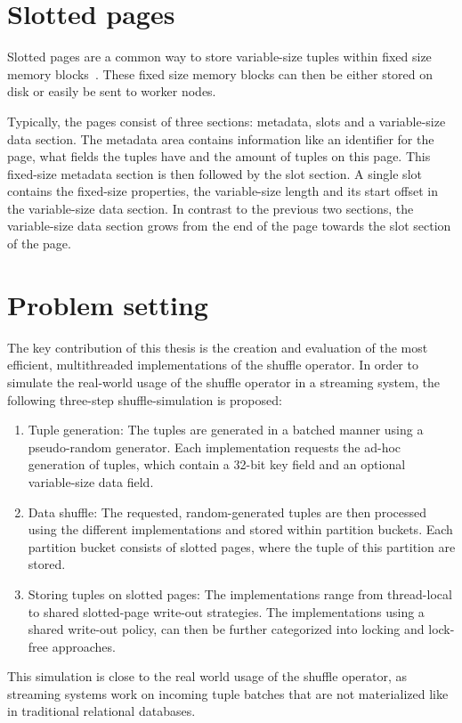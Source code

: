 \section{Slotted pages}
Slotted pages are a common way to store variable-size tuples within fixed size memory blocks~\parencite{Data-page-layouts-for-relational-databases}. These fixed size memory blocks can then be either stored on disk or easily be sent to worker nodes.

Typically, the pages consist of three sections: metadata, slots and a variable-size data section. The metadata area contains information like an identifier for the page, what fields the tuples have and the amount of tuples on this page. This fixed-size metadata section is then followed by the slot section. A single slot contains the fixed-size properties, the variable-size length and its start offset in the variable-size data section. In contrast to the previous two sections, the variable-size data section grows from the end of the page towards the slot section of the page.


\section{Problem setting}
The key contribution of this thesis is the creation and evaluation of the most efficient, multithreaded implementations of the shuffle operator.
In order to simulate the real-world usage of the shuffle operator in a streaming system, the following three-step shuffle-simulation is proposed:

\begin{enumerate}
    \item Tuple generation: The tuples are generated in a batched manner using a pseudo-random generator. Each implementation requests the ad-hoc generation of tuples, which contain a 32-bit key field and an optional variable-size data field.

    \item Data shuffle: The requested, random-generated tuples are then processed using the different implementations and stored within partition buckets. Each partition bucket consists of slotted pages, where the tuple of this partition are stored.

    \item Storing tuples on slotted pages: The implementations range from thread-local to shared slotted-page write-out strategies. The implementations using a shared write-out policy, can then be further categorized into locking and lock-free approaches.
\end{enumerate}
This simulation is close to the real world usage of the shuffle operator, as streaming systems work on incoming tuple batches that are not materialized like in traditional relational databases.

